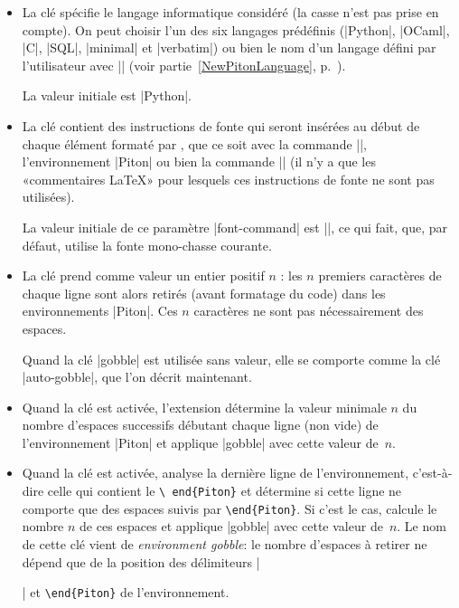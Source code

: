 \documentclass[dvipsnames,svgnames]{article}
\begin{document}
\begin{itemize}
\item La clé  spécifie le langage informatique considéré (la casse
n'est pas prise en compte). On peut choisir l'un des six langages prédéfinis (|Python|,
|OCaml|, |C|, |SQL|, |minimal| et |verbatim|) ou bien le nom d'un langage défini par
l'utilisateur avec |\NewPitonLanguage| (voir partie~\ref{NewPitonLanguage},
p.~\pageref{NewPitonLanguage}). 

La valeur initiale est |Python|.

\item {} La clé  contient des
instructions de fonte qui seront insérées au début de chaque élément formaté par
, que ce soit avec la commande |\piton|, l'environnement |{Piton}| ou
bien la commande |\PitonInputFile| (il n'y a que les «commentaires LaTeX» pour
lesquels ces instructions de fonte ne sont pas utilisées).

La valeur initiale de ce paramètre |font-command| est |\ttfamily|, ce qui fait,
que, par défaut,  utilise la fonte mono-chasse courante.

\item {}\label{gobble} La clé  prend comme valeur
un entier positif $n$ : les $n$ premiers caractères de chaque ligne sont alors
retirés (avant formatage du code) dans les environnements |{Piton}|. Ces $n$
caractères ne sont pas nécessairement des espaces.

Quand la clé |gobble| est utilisée sans valeur, elle se comporte comme la clé
|auto-gobble|, que l'on décrit maintenant.

\item {} Quand la clé
 est activée, l'extension  détermine la
valeur minimale $n$ du nombre d'espaces successifs débutant chaque ligne (non
vide) de l'environnement |{Piton}| et applique |gobble| avec cette valeur
de~$n$.

\item {} Quand la clé
 est activée,  analyse la dernière ligne de
l'environnement, c'est-à-dire celle qui contient le \texttt{\textbackslash
  end\{Piton\}} et détermine si cette ligne ne comporte que des espaces suivis
par \texttt{\textbackslash end\{Piton\}}. Si c'est le cas,  calcule
le nombre $n$ de ces espaces et applique |gobble| avec cette valeur de~$n$. Le
nom de cette clé vient de \emph{environment gobble}: le nombre d'espaces à
retirer ne dépend que de la position des délimiteurs |\begin{Piton}| et
\texttt{\textbackslash end\{Piton\}} de l'environnement.


\end{Piton}
\end{itemize}
\end{document}
